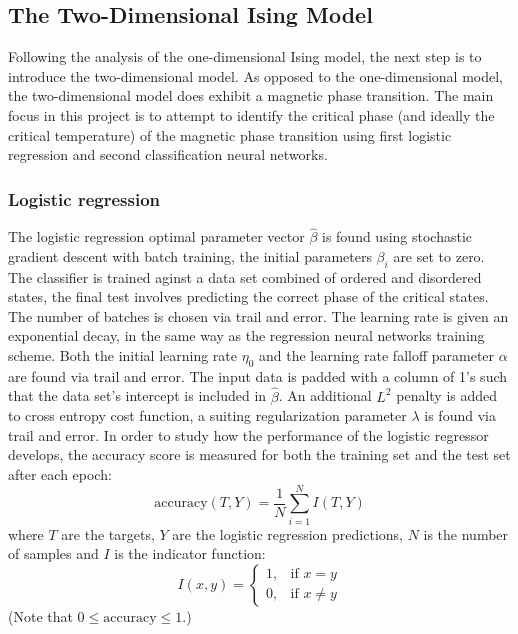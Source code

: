 \documentclass[nofootinbib,reprint,english]{revtex4-1}
\newcommand{\betahat}{\hat{\beta}}
\begin{document}
\subsection{The Two-Dimensional Ising Model}
Following the analysis of the one-dimensional Ising model, the next step is to introduce the two-dimensional model. As opposed to the one-dimensional model, the two-dimensional model does exhibit a magnetic phase transition. The main focus in this project is to attempt to identify the critical phase (and ideally the critical temperature) of the magnetic phase transition using first logistic regression and second classification neural networks.
\newpage
\subsubsection{Logistic regression}
The logistic regression optimal parameter vector \(\betahat\) is found using stochastic gradient descent with batch training, the initial parameters \(\beta_i\) are set to zero. The classifier is trained aginst a data set combined of ordered and disordered states, the final test involves predicting the correct phase of the critical states. The number of batches is chosen via trail and error. The learning rate is given an exponential decay, in the same way as the regression neural networks training scheme. Both the initial learning rate \(\eta_0\) and the learning rate falloff parameter \(\alpha\) are found via trail and error. The input data is padded with a column of 1's such that the data set's intercept is included in \(\betahat\). An additional \(L^2\) penalty is added to cross entropy cost function, a suiting regularization parameter \(\lambda\) is found via trail and error. In order to study how the performance of the logistic regressor develops, the accuracy score is measured for both the training set and the test set after each epoch:
\begin{equation}
\text{accuracy}(T,Y)=\frac{1}{N}\sum_{i=1}^NI(T,Y)
\end{equation}
where \(T\) are the targets, \(Y\) are the logistic regression predictions, \(N\) is the number of samples and \(I\) is the indicator function:
\begin{equation}
I(x,y)=\begin{cases}1,&\text{if }x=y\\0,&\text{if }x\neq y\end{cases}
\end{equation}
(Note that \(0\leq\text{accuracy}\leq1\).)
\end{document}
